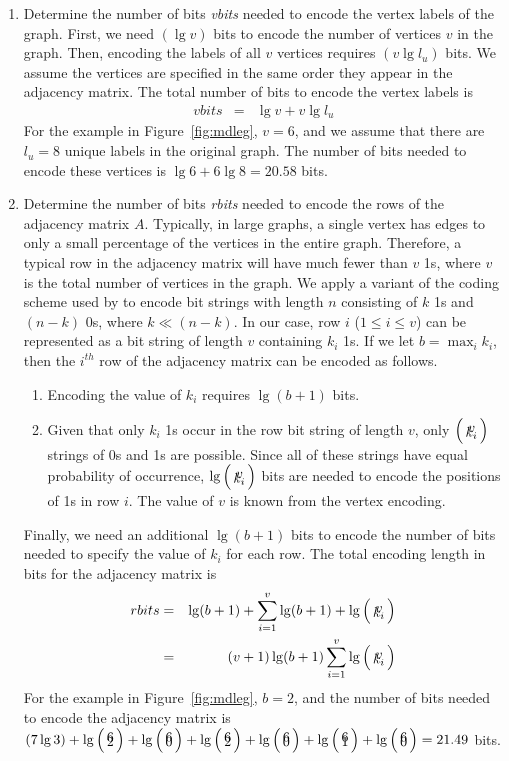 \begin{enumerate}

\item Determine the number of bits {\em vbits} needed to encode the vertex
labels of the graph.  First, we need $(\lg v)$ bits to encode the number of
vertices $v$ in the graph.  Then, encoding the labels of all $v$ vertices
requires $(v \lg l_u)$ bits.  We assume the vertices are specified in the
same order they appear in the adjacency matrix.  The total number of bits
to encode the vertex labels is
\begin{eqnarray*}
 vbits & = & \lg v + v \lg l_u
\end{eqnarray*}
For the example in Figure~\ref{fig:mdleg}, $v=6$, and we assume that there
are $l_u = 8$ unique labels in the original graph.  The number of bits
needed to encode these vertices is $\lg 6 + 6 \lg 8 = 20.58$ bits.

\item Determine the number of bits {\em rbits} needed to encode the rows of
the adjacency matrix $A$.  Typically, in large graphs, a single vertex has
edges to only a small percentage of the vertices in the entire graph.
Therefore, a typical row in the adjacency matrix will have much fewer than
$v$ 1s, where $v$ is the total number of vertices in the graph.  We apply a
variant of the coding scheme used by \cite{quinlan/mdl} to encode bit
strings with length $n$ consisting of $k$ 1s and $(n-k)$ 0s, where $k \ll
(n-k)$.  In our case, row $i$ ($1 \leq i \leq v$) can be represented as a
bit string of length $v$ containing $k_i$ 1s.  If we let $b = \max_i k_i$,
then the $i^{th}$ row of the adjacency matrix can be encoded as follows.

\begin{enumerate}

\item Encoding the value of $k_i$ requires $\lg (b+1)$ bits.

\item Given that only $k_i$ 1s occur in the row bit string of length
$v$, only $\comb{v}{k_i}$ strings of 0s and 1s are possible.  Since all of
these strings have equal probability of occurrence, $\lg \comb{v}{k_i}$
bits are needed to encode the positions of 1s in row $i$.  The value of $v$
is known from the vertex encoding.

\end{enumerate}

Finally, we need an additional $\lg (b+1)$ bits to encode the number of
bits needed to specify the value of $k_i$ for each row.  The total encoding
length in bits for the adjacency matrix is
\begin{eqnarray*}
 rbits & = & \lg (b+1) + \sum_{i=1}^{v} \lg (b+1) + \lg \comb{v}{k_i} \\
       & = & (v+1) \lg (b+1) \sum_{i=1}^{v} \lg \comb{v}{k_i}
\end{eqnarray*}
For the example in Figure~\ref{fig:mdleg}, $b=2$, and the number of bits
needed to encode the adjacency matrix is $(7 \lg 3) + \lg \comb{6}{2} + \lg
\comb{6}{0} + \lg \comb{6}{2} + \lg \comb{6}{0} + \lg \comb{6}{1} + \lg
\comb{6}{0} = 21.49$ bits.


\end{enumerate}
